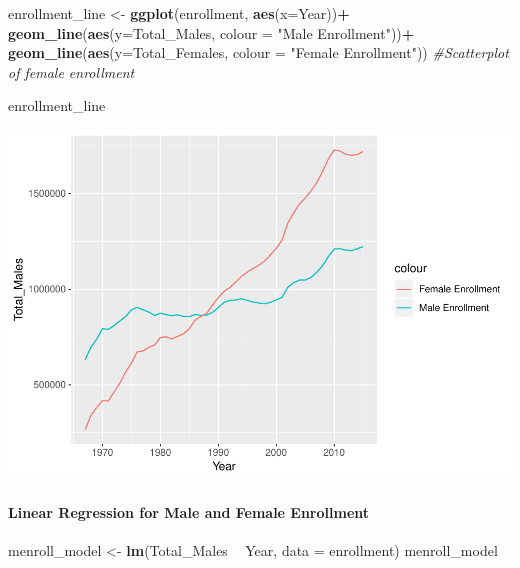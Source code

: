 \documentclass[]{article}
\newenvironment{Shaded}{\begin{snugshade}}{\end{snugshade}}
\newcommand{\KeywordTok}[1]{\textcolor[rgb]{0.13,0.29,0.53}{\textbf{#1}}}
\newcommand{\DataTypeTok}[1]{\textcolor[rgb]{0.13,0.29,0.53}{#1}}
\newcommand{\StringTok}[1]{\textcolor[rgb]{0.31,0.60,0.02}{#1}}
\newcommand{\CommentTok}[1]{\textcolor[rgb]{0.56,0.35,0.01}{\textit{#1}}}
\newcommand{\OperatorTok}[1]{\textcolor[rgb]{0.81,0.36,0.00}{\textbf{#1}}}
\newcommand{\NormalTok}[1]{#1}
\let\oldparagraph\paragraph
\renewcommand{\paragraph}[1]{\oldparagraph{#1}\mbox{}}
\begin{document}
\begin{Shaded}
\begin{Highlighting}[]
\NormalTok{enrollment_line <-}\StringTok{ }\KeywordTok{ggplot}\NormalTok{(enrollment, }\KeywordTok{aes}\NormalTok{(}\DataTypeTok{x=}\NormalTok{Year))}\OperatorTok{+}
\StringTok{  }\KeywordTok{geom_line}\NormalTok{(}\KeywordTok{aes}\NormalTok{(}\DataTypeTok{y=}\NormalTok{Total_Males, }\DataTypeTok{colour =} \StringTok{"Male Enrollment"}\NormalTok{))}\OperatorTok{+}
\StringTok{  }\KeywordTok{geom_line}\NormalTok{(}\KeywordTok{aes}\NormalTok{(}\DataTypeTok{y=}\NormalTok{Total_Females, }\DataTypeTok{colour =} \StringTok{"Female Enrollment"}\NormalTok{))}
   \CommentTok{#Scatterplot of female enrollment}

\NormalTok{enrollment_line}
\end{Highlighting}
\end{Shaded}

\includegraphics{Assignment_5_Markdown_files/figure-latex/unnamed-chunk-2-1.pdf}

\paragraph{Linear Regression for Male and Female
Enrollment}\label{linear-regression-for-male-and-female-enrollment}

\begin{Shaded}
\begin{Highlighting}[]
\NormalTok{menroll_model <-}\StringTok{ }\KeywordTok{lm}\NormalTok{(Total_Males }\OperatorTok{~}\StringTok{ }\NormalTok{Year, }\DataTypeTok{data =}\NormalTok{ enrollment)}
\NormalTok{menroll_model}
\end{Highlighting}
\end{Shaded}
\end{document}
